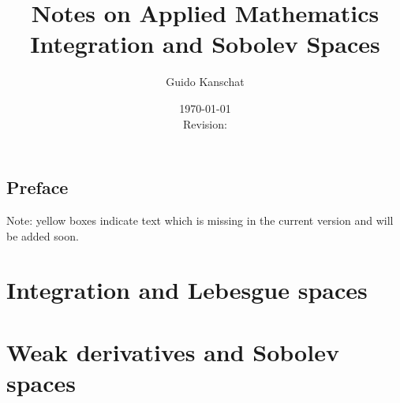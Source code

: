 \documentclass[USenglish,limits]{report}
\title{\textbf{Notes on Applied Mathematics}
\\[5mm]
{\large Integration and Sobolev Spaces}}
\author{Guido Kanschat}
\date{\today\\[5mm]Revision: \svnrev}
\begin{document}
\maketitle

\section*{Preface}


\begin{todo}
  Note: yellow boxes indicate text which is missing in the current
  version and will be added soon.
\end{todo}

\tableofcontents

\chapter{Integration and Lebesgue spaces}



\chapter{Weak derivatives and Sobolev spaces}


\printbibliography
\printindex
\end{document}
